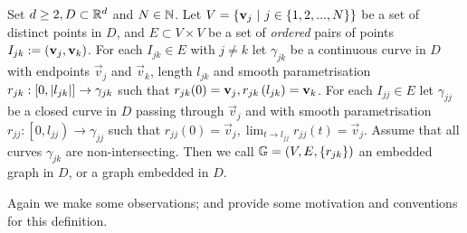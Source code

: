 \begin{definition} \label{def:EmbeddedGraph}
	Set $d\geq2, D\subset\mathbb{R}^d$ and $N\in\mathbb{N}$.
	Let $V = \clbracs{\vec{v}_j \ \vert \ j\in\clbracs{1,2,...,N}}$ be a set of distinct points in $D$, and $E\subset V\times V$ be a set of \textit{ordered} pairs of points $I_{jk} := \left( \mathbf{v}_j, \mathbf{v}_k \right)$.
	For each $I_{jk}\in E$ with $j\neq k$ let $\gamma_{jk}$ be a continuous curve in $D$ with endpoints $\vec{v}_j$ and $\vec{v}_k$, length $l_{jk}$ and smooth parametrisation $r_{jk}:\left[ 0,\left\lvert l_{jk} \right\rvert \right]\rightarrow\gamma_{jk}$ such that $r_{jk}(0) = \mathbf{v}_j, r_{jk}\left( l_{jk} \right) = \mathbf{v}_k$.
	For each $I_{jj}\in E$ let $\gamma_{jj}$ be a closed curve in $D$ passing through $\vec{v}_j$ and with smooth parametrisation $r_{jj}:\left[0,l_{jj}\right)\rightarrow\gamma_{jj}$ such that $r_{jj}(0) = \vec{v}_{j}, \lim_{t\rightarrow l_{jj}}r_{jj}(t) = \vec{v}_j$.
	Assume that all curves $\gamma_{jk}$ are non-intersecting.
	Then we call $\mathbb{G}=\left( V, E, \left\{ r_{jk} \right\} \right)$ an embedded graph in $D$, or a graph embedded in $D$.
\end{definition}
Again we make some observations; and provide some motivation and conventions for this definition.
